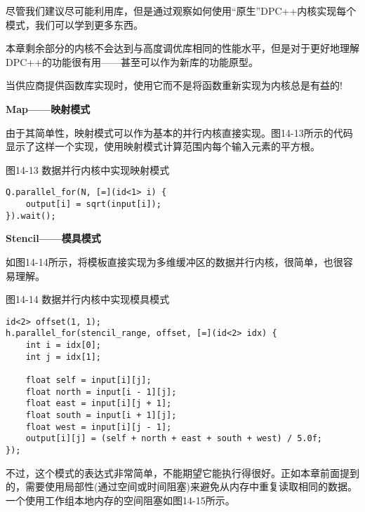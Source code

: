 尽管我们建议尽可能利用库，但是通过观察如何使用“原生”DPC++内核实现每个模式，我们可以学到更多东西。\par

本章剩余部分的内核不会达到与高度调优库相同的性能水平，但是对于更好地理解DPC++的功能很有用——甚至可以作为新库的功能原型。\par

\begin{tcolorbox}[colback=blue!5!white,colframe=blue!75!black, title=使用供应商提供的库!]
当供应商提供函数库实现时，使用它而不是将函数重新实现为内核总是有益的!
\end{tcolorbox}

\hspace*{\fill} \par %
\textbf{Map——映射模式}

由于其简单性，映射模式可以作为基本的并行内核直接实现。图14-13所示的代码显示了这样一个实现，使用映射模式计算范围内每个输入元素的平方根。\par

\hspace*{\fill} \par %
图14-13 数据并行内核中实现映射模式
\begin{lstlisting}[caption={}]
Q.parallel_for(N, [=](id<1> i) {
	output[i] = sqrt(input[i]);
}).wait();
\end{lstlisting}

\hspace*{\fill} \par %
\textbf{Stencil——模具模式}

如图14-14所示，将模板直接实现为多维缓冲区的数据并行内核，很简单，也很容易理解。\par

\hspace*{\fill} \par %
图14-14 数据并行内核中实现模具模式
\begin{lstlisting}[caption={}]
id<2> offset(1, 1);
h.parallel_for(stencil_range, offset, [=](id<2> idx) {
	int i = idx[0];
	int j = idx[1];
	
	float self = input[i][j];
	float north = input[i - 1][j];
	float east = input[i][j + 1];
	float south = input[i + 1][j];
	float west = input[i][j - 1];
	output[i][j] = (self + north + east + south + west) / 5.0f;
});
\end{lstlisting}

不过，这个模式的表达式非常简单，不能期望它能执行得很好。正如本章前面提到的，需要使用局部性(通过空间或时间阻塞)来避免从内存中重复读取相同的数据。一个使用工作组本地内存的空间阻塞如图14-15所示。\par

